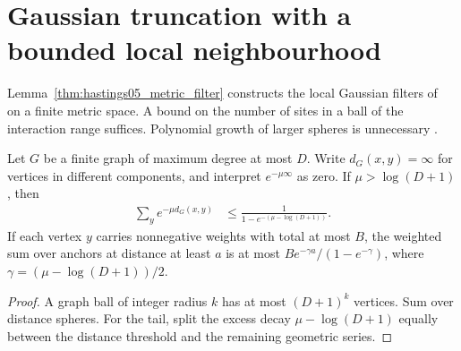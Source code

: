 \section{Gaussian truncation with a bounded local neighbourhood}
\label{sec:hastings05_metric_filter}

Lemma~\ref{thm:hastings05_metric_filter} constructs the local Gaussian
filters of~\cite[eq.~(mid), lines 285--349]{Hastings2006Solving} on a finite
metric space. A bound on the number of sites in a ball of the interaction
range suffices. Polynomial growth of larger spheres is unnecessary
\cite{gap:hastings05_geometric_growth_scope}.

\begin{lemma}
    \label{lem:hastings05_degree_tail}
    \leanok
    Let $G$ be a finite graph of maximum degree at most $D$. Write
    $d_G(x,y)=\infty$ for vertices in different components, and interpret
    $e^{-\mu\infty}$ as zero. If $\mu>\log(D+1)$, then
    \begin{align}
        \sum_y e^{-\mu d_G(x,y)}
        &\le \frac{1}{1-e^{-(\mu-\log(D+1))}}.
        \label{eq:hastings05_degree_sum}
    \end{align}
    If each vertex $y$ carries nonnegative weights with total at most $B$,
    the weighted sum over anchors at distance at least $a$ is at most
    $B e^{-\gamma a}/(1-e^{-\gamma})$, where
    $\gamma=(\mu-\log(D+1))/2$.
\end{lemma}
\begin{proof}\leanok
    A graph ball of integer radius $k$ has at most $(D+1)^k$ vertices.
    Sum over distance spheres. For the tail, split the excess decay
    $\mu-\log(D+1)$ equally between the distance threshold and the
    remaining geometric series.
\end{proof}

